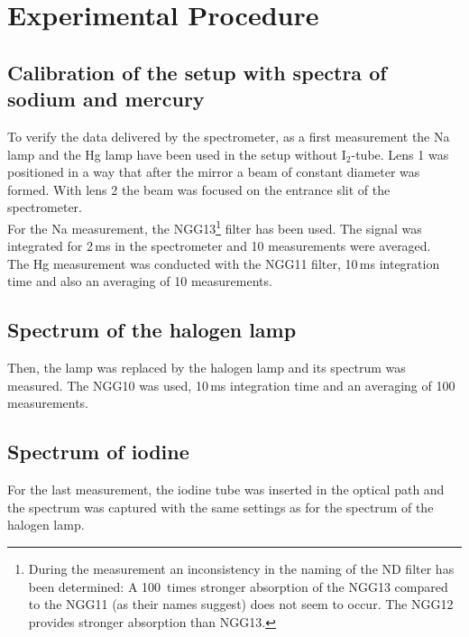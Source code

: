 \section{Experimental Procedure}

\subsection{Calibration of the setup with spectra of sodium and mercury}
To verify the data delivered by the spectrometer, as a first measurement the Na lamp and the Hg lamp
have been used in the setup without I$_2$-tube.
Lens 1 was positioned in a way that after the mirror a beam of constant diameter was formed.
With lens 2 the beam was focused on the entrance slit of the spectrometer.\\
For the Na measurement, the NGG13\footnote{During
the measurement an inconsistency in the naming of the ND filter has been determined:
A 100~times stronger absorption of the NGG13 compared to the NGG11 (as their names suggest) does not seem to occur.
The NGG12 provides stronger absorption than NGG13.}
filter has been used.
The signal was integrated for 2\,ms in the spectrometer and 10 measurements were averaged.\\
The Hg measurement was conducted with the NGG11 filter,
10\,ms integration time and also an averaging of 10 measurements.

\subsection{Spectrum of the halogen lamp}
Then, the lamp was replaced by the halogen lamp and its spectrum was measured.
The NGG10 was used, 10\,ms integration time and an averaging of 100 measurements.

\subsection{Spectrum of iodine}
For the last measurement, the iodine tube was inserted in the optical path and the spectrum was captured
with the same settings as for the spectrum of the halogen lamp.